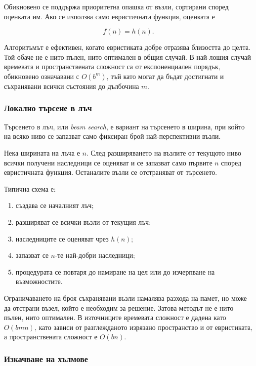 Обикновено се поддържа приоритетна опашка от възли, сортирани според оценката им. Ако се използва само евристичната функция, оценката е

\[
f(n)=h(n).
\]

Алгоритъмът е ефективен, когато евристиката добре отразява близостта до целта. Той обаче не е нито пълен, нито оптимален в общия случай. В най-лошия случай времевата и пространствената сложност са от експоненциален порядък, обикновено означавани с $O(b^m)$, тъй като могат да бъдат достигнати и съхранявани всички състояния до дълбочина $m$.

\subsubsection{Локално търсене в лъч}

\begin{defn}
Търсенето в лъч, или \emph{beam search}, е вариант на търсенето в ширина, при който на всяко ниво се запазват само фиксиран брой най-перспективни възли.
\end{defn}

Нека ширината на лъча е $n$. След разширяването на възлите от текущото ниво всички получени наследници се оценяват и се запазват само първите $n$ според евристичната функция. Останалите възли се отстраняват от търсенето.

Типична схема е:

\begin{enumerate}
\item създава се началният лъч;
\item разширяват се всички възли от текущия лъч;
\item наследниците се оценяват чрез $h(n)$;
\item запазват се $n$-те най-добри наследници;
\item процедурата се повтаря до намиране на цел или до изчерпване на възможностите.
\end{enumerate}

Ограничаването на броя съхранявани възли намалява разхода на памет, но може да отстрани възел, който е необходим за решение. Затова методът не е нито пълен, нито оптимален. В източниците времевата сложност е дадена като $O(bmn)$, като зависи от разглежданото изрязано пространство и от евристиката, а пространствената сложност е $O(bn)$.

\subsubsection{Изкачване на хълмове}

